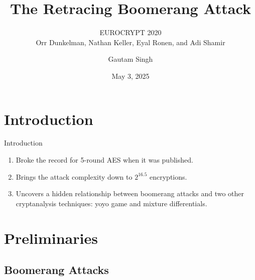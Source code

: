 \documentclass[notheorems]{beamer}
\title{The Retracing Boomerang Attack}
\subtitle{EUROCRYPT 2020\\Orr Dunkelman, Nathan Keller, Eyal Ronen, and Adi Shamir}
\author{Gautam Singh}
\institute[IITH]{Indian Institute of Technology Hyderabad}
\date{May 3, 2025}
\theoremstyle{definition}
\theoremstyle{example}
\begin{document}
    
    \begin{frame}
        \titlepage
    \end{frame}
    
    \begin{frame}
        \tableofcontents[hideallsubsections]
    \end{frame}
    
    \section{Introduction}
    \label{sec:intro}
    
    \begin{frame}[<+->]{Introduction}
        \begin{enumerate}
            \item Broke the record for 5-round AES when it was
            published.
            \item Brings the attack complexity down to \(2^{16.5}\)
            encryptions.
            \item Uncovers a hidden relationship between boomerang attacks and
            two other cryptanalysis techniques: yoyo game and mixture
            differentials.
        \end{enumerate}
    \end{frame}

    \section{Preliminaries}
    \label{sec:prelims}

    \subsection{Boomerang Attacks}
    \label{subsec:boomerang}
\end{document}
